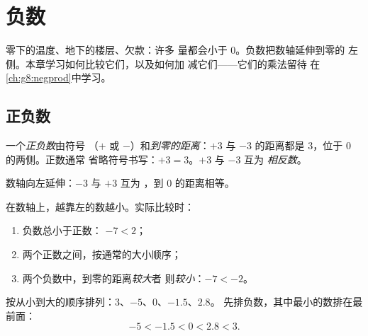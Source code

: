 \chapter{负数}\label{ch:g7:negatives}

零下的温度、地下的楼层、欠款：许多
量都会小于 $0$。负数把数轴延伸到零的
左侧。本章学习如何比较它们，以及如何加
减它们——它们的乘法留待
在\cref{ch:g8:negprod}中学习。

\section{正负数}

\begin{definition}[正负数]\label{def:g7:negatives:def}
一个\emph{正负数}由符号
（$+$ 或 $-$）和\emph{到零的距离}：$+3$ 与 $-3$
的距离都是 $3$，位于 $0$ 的两侧。正数通常
省略符号书写：$+3 = 3$。$+3$ 与 $-3$ 互为
\emph{相反数}。
\end{definition}

\begin{omfigure}

{\small 数轴向左延伸：$-3$ 与 $+3$ 互为
，到 $0$ 的距离相等。}
\end{omfigure}

\begin{method}[比较正负数]\label{met:g7:negatives:compare}
在数轴上，越靠左的数越小。实际比较时：
\begin{enumerate}
  \item 负数总小于正数：
        $-7 < 2$；
  \item 两个正数之间，按通常的大小顺序；
  \item 两个负数中，到零的距离\emph{较大}者
        则\emph{较小}：$-7 < -2$。
\end{enumerate}
\end{method}

\begin{example}\label{ex:g7:negatives:compare}
按从小到大的顺序排列：$3$、$-5$、$0$、$-1.5$、$2.8$。
先排负数，其中最小的数排在最前面：
\[
-5 < -1.5 < 0 < 2.8 < 3 .
\]
\end{example}

